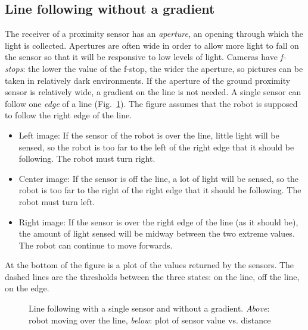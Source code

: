 \subsection{Line following without a gradient}\label{s.no-gradient}

The receiver of a proximity sensor has an \emph{aperture}, an opening through which the light is collected. Apertures are often wide in order to allow more light to fall on the sensor so that it will be responsive to low levels of light. Cameras have \emph{f-stops}: the lower the value of the f-stop, the wider the aperture, so pictures can be taken in relatively dark environments. If the aperture of the ground proximity sensor is relatively wide, a gradient on the line is not needed. A single sensor can follow one \emph{edge} of a line (Fig.~\ref{fig.no-gradient}). The figure assumes that the robot is supposed to follow the right edge of the line.
\begin{itemize}
\item Left image: If the sensor of the robot is over the line, little light will be sensed, so the robot is too far to the left of the right edge that it should be following. The robot must turn right.
\item Center image: If the sensor is off the line, a lot of light will be sensed, so the robot is too far to the right of the right edge that it should be following. The robot must turn left.
\item Right image: If the sensor is over the right edge of the line (as it should be), the amount of light sensed will be midway between the two extreme values. The robot can continue to move forwards.
\end{itemize}
At the bottom of the figure is a plot of the values returned by the sensors. The dashed lines are the thresholds between the three states: on the line, off the line, on the edge.

\begin{figure}
\begin{center}
\caption{Line following with a single sensor and without a gradient. \textit{Above}: robot moving over the line, \textit{below}: plot of sensor value vs. distance}\label{fig.no-gradient}
\end{center}
\end{figure}

